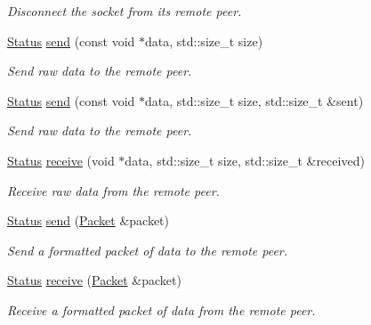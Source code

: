\begin{DoxyCompactItemize}
\begin{DoxyCompactList}\small\item\em Disconnect the socket from its remote peer. \end{DoxyCompactList}\item 
\mbox{\hyperlink{classsf_1_1_socket_a51bf0fd51057b98a10fbb866246176dc}{Status}} \mbox{\hyperlink{classsf_1_1_tcp_socket_affce26ab3bcc4f5b9269dad79db544c0}{send}} (const void $\ast$data, std\+::size\+\_\+t size)
\begin{DoxyCompactList}\small\item\em Send raw data to the remote peer. \end{DoxyCompactList}\item 
\mbox{\hyperlink{classsf_1_1_socket_a51bf0fd51057b98a10fbb866246176dc}{Status}} \mbox{\hyperlink{classsf_1_1_tcp_socket_a31f5b280126a96c6f3ad430f4cbcb54d}{send}} (const void $\ast$data, std\+::size\+\_\+t size, std\+::size\+\_\+t \&sent)
\begin{DoxyCompactList}\small\item\em Send raw data to the remote peer. \end{DoxyCompactList}\item 
\mbox{\hyperlink{classsf_1_1_socket_a51bf0fd51057b98a10fbb866246176dc}{Status}} \mbox{\hyperlink{classsf_1_1_tcp_socket_a90ce50811ea61d4f00efc62bb99ae1af}{receive}} (void $\ast$data, std\+::size\+\_\+t size, std\+::size\+\_\+t \&received)
\begin{DoxyCompactList}\small\item\em Receive raw data from the remote peer. \end{DoxyCompactList}\item 
\mbox{\hyperlink{classsf_1_1_socket_a51bf0fd51057b98a10fbb866246176dc}{Status}} \mbox{\hyperlink{classsf_1_1_tcp_socket_a0f8276e2b1c75aac4a7b0a707b250f44}{send}} (\mbox{\hyperlink{classsf_1_1_packet}{Packet}} \&packet)
\begin{DoxyCompactList}\small\item\em Send a formatted packet of data to the remote peer. \end{DoxyCompactList}\item 
\mbox{\hyperlink{classsf_1_1_socket_a51bf0fd51057b98a10fbb866246176dc}{Status}} \mbox{\hyperlink{classsf_1_1_tcp_socket_aa655352609bc9804f2baa020df3e7331}{receive}} (\mbox{\hyperlink{classsf_1_1_packet}{Packet}} \&packet)
\begin{DoxyCompactList}\small\item\em Receive a formatted packet of data from the remote peer. \end{DoxyCompactList}\end{DoxyCompactItemize}
